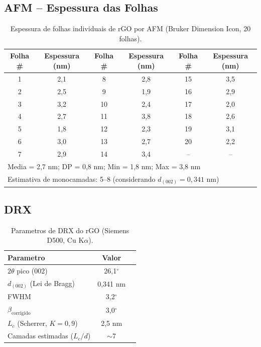 \documentclass[11pt,a4paper]{article}
\begin{document}
\subsection{AFM -- Espessura das Folhas}

\begin{table}[H]\centering
\caption{Espessura de folhas individuais de rGO por AFM (Bruker Dimension Icon, 20 folhas).}\label{tab:afm}
\begin{tabular}{cccccc}
\toprule
{\bfseries Folha \#} & {\bfseries Espessura (nm)} & {\bfseries Folha \#} & {\bfseries Espessura (nm)} & {\bfseries Folha \#} & {\bfseries Espessura (nm)} \\
\midrule
1 & 2,1 & 8 & 2,8 & 15 & 3,5 \\
2 & 2,5 & 9 & 1,9 & 16 & 2,9 \\
3 & 3,2 & 10 & 2,4 & 17 & 2,0 \\
4 & 2,7 & 11 & 3,8 & 18 & 2,6 \\
5 & 1,8 & 12 & 2,3 & 19 & 3,1 \\
6 & 3,0 & 13 & 2,7 & 20 & 2,2 \\
7 & 2,9 & 14 & 3,4 & -- & -- \\
\midrule
\multicolumn{6}{l}{Media = 2,7 nm; DP = 0,8 nm; Min = 1,8 nm; Max = 3,8 nm} \\
\multicolumn{6}{l}{Estimativa de monocamadas: 5--8 (considerando $d_{(002)}=0,341$ nm)} \\
\bottomrule
\end{tabular}
\end{table}

\subsection{DRX}

\begin{table}[H]\centering
\caption{Parametros de DRX do rGO (Siemens D500, Cu K$\alpha$).}\label{tab:drx}
\begin{tabular}{lcc}
\toprule
{\bfseries Parametro} & {\bfseries Valor} \\
\midrule
$2\theta$ pico (002) & 26,1$^{\circ}$ \\
$d_{(002)}$ (Lei de Bragg) & 0,341 nm \\
FWHM & 3,2$^{\circ}$ \\
$\beta_{\text{corrigido}}$ & 3,0$^{\circ}$ \\
$L_c$ (Scherrer, $K=0,9$) & 2,5 nm \\
Camadas estimadas ($L_c/d$) & $\sim$7 \\
\bottomrule
\end{tabular}
\end{table}
\end{document}
